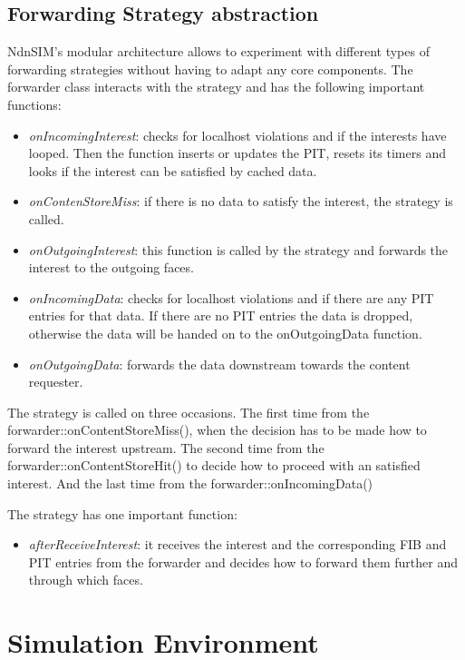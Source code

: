 \subsection{Forwarding Strategy abstraction}

NdnSIM's modular architecture allows to experiment with different types of forwarding strategies without having to adapt any core components. The forwarder class interacts with the strategy and has the following important functions:

\begin{itemize}
\item \emph{onIncomingInterest}: checks for localhost violations and if the interests have looped. Then the function inserts or updates the PIT, resets its timers and looks if the interest can be satisfied by cached data.
\item \emph{onContenStoreMiss}: if there is no data to satisfy the interest, the strategy is called.
\item \emph{onOutgoingInterest}: this function is called by the strategy and forwards the interest to the outgoing faces.
\item \emph{onIncomingData}: checks for localhost violations and if there are any PIT entries for that data. If there are no PIT entries the data is dropped, otherwise the data will be handed on to the onOutgoingData function.
\item \emph{onOutgoingData}: forwards the data downstream towards the content requester.
\end{itemize}


The strategy is called on three occasions. The first time from the forwarder::onContentStoreMiss(), when the decision has to be made how to forward the interest upstream. The second time from the forwarder::onContentStoreHit() to decide how to proceed with an satisfied interest. And the last time from the forwarder::onIncomingData()

\vspace{5mm} %

The strategy has one important function:

\begin{itemize}
\item \emph{afterReceiveInterest}: it receives the interest and the corresponding FIB and PIT entries from the forwarder and decides how to forward them further and through which faces.
\end{itemize}

\section{Simulation Environment}

